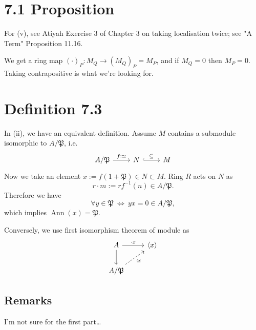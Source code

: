 
\section{7.1 Proposition}

For (v), see Atiyah \cite{atiyah1994introduction} Exercise 3 of Chapter 3 on taking localisation twice; see "A Term" \cite{altman} Proposition 11.16.

We get a ring map $(\cdot)_{P}:M_{Q}\to (M_Q)_P=M_P$, and if $M_Q=0$ then $M_P=0$. Taking contrapositive is what we're looking for.

\section{Definition 7.3}

In (ii), we have an equivalent definition. 
Assume $M$ contains a submodule isomorphic to $A/\mathfrak P$, i.e. 
\[\begin{tikzcd}
	{A/\mathfrak{P}} & N & M
	\arrow["\subseteq", hook, from=1-2, to=1-3]
	\arrow["{f:\simeq}", from=1-1, to=1-2]
\end{tikzcd}\]
Now we take an element $x:=f(1+\mathfrak P)\in N\subset M$. Ring $R$ acts on $N$ as 
$$r\cdot m:= rf^{-1}(n)\in A/\mathfrak P.$$
Therefore we have $$\forall y\in\mathfrak P ~\Leftrightarrow~ yx=0\in A/\mathfrak P,$$which implies $\operatorname{Ann}(x)=\mathfrak P$.

Conversely, we use first isomorphism theorem of module as 
\[\begin{tikzcd}
	A & {\langle x\rangle} \\
	{A/\mathfrak P}
	\arrow[from=1-1, to=2-1]
	\arrow["{\cdot x}", from=1-1, to=1-2]
	\arrow["\simeq"', dashed, from=2-1, to=1-2]
\end{tikzcd}\]

\subsection{Remarks}
I'm not sure for the first part\dots

